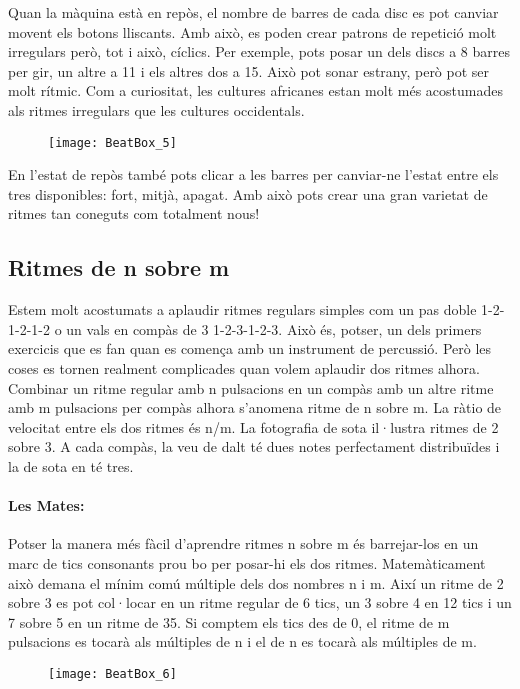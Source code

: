 Quan la màquina està en repòs, el nombre de barres de cada disc es pot canviar movent els botons lliscants. Amb això, es poden crear patrons de repetició molt irregulars però, tot i això, cíclics. Per exemple, pots posar un dels discs a 8 barres per gir, un altre a 11 i els altres dos a 15. Això pot sonar estrany, però pot ser molt rítmic. Com a curiositat, les cultures africanes estan molt més acostumades als ritmes irregulars que les cultures occidentals.

\begin{figure}[h]
\centering
\texttt{[image: BeatBox\_5]}
\end{figure}

En l'estat de repòs també pots clicar a les barres per canviar-ne l'estat entre els tres disponibles: fort, mitjà, apagat. Amb això pots crear una gran varietat de ritmes tan coneguts com totalment nous!


\subsection{Ritmes de n sobre m}
Estem molt acostumats a aplaudir ritmes regulars simples com un pas doble 1-2-1-2-1-2 o un vals en compàs de 3 1-2-3-1-2-3. Això és, potser, un dels primers exercicis que es fan quan es comença amb un instrument de percussió. Però les coses es tornen realment complicades quan volem aplaudir dos ritmes alhora. Combinar un ritme regular amb n pulsacions en un compàs amb un altre ritme amb m pulsacions per compàs alhora s'anomena ritme de n sobre m. La ràtio de velocitat entre els dos ritmes és n/m. La fotografia de sota il·lustra ritmes de 2 sobre 3. A cada compàs, la veu de dalt té dues notes perfectament distribuïdes i la de sota en té tres.

\paragraph{Les Mates:}
Potser la manera més fàcil d'aprendre ritmes n sobre m és barrejar-los en un marc de tics consonants prou bo per posar-hi els dos ritmes. Matemàticament això demana el mínim comú múltiple dels dos nombres n i m. Així un ritme de 2 sobre 3 es pot col·locar en un ritme regular de 6 tics, un 3 sobre 4 en 12 tics i un 7 sobre 5 en un ritme de 35. Si comptem els tics des de 0, el ritme de m pulsacions es tocarà als múltiples de n i el de n es tocarà als múltiples de m.

\begin{figure}[h]
\centering
\texttt{[image: BeatBox\_6]}
\end{figure}

